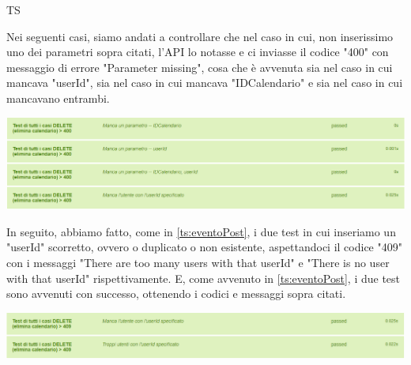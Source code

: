\begin{listaPersonale}{TS}
\begin{center}
                \end{center}
                Nei seguenti casi, siamo andati a controllare che nel caso in cui, non inserissimo uno dei parametri sopra citati, l'API lo notasse e ci inviasse il codice "400" con messaggio di errore "Parameter missing", cosa che è avvenuta sia nel caso in cui mancava "userId", sia nel caso in cui mancava "IDCalendario" e sia nel caso in cui mancavano entrambi.
                \begin{center}
                        \includegraphics[width=1\textwidth, height=0.15\textheight]{img/png/tests/CalendarioDelete/400_missingParameter_deleteCalendario.png}
                \end{center}
                In seguito, abbiamo fatto, come in \ref{ts:eventoPost}, i due test in cui inseriamo un "userId" scorretto, ovvero o duplicato o non esistente, aspettandoci il codice "409" con i messaggi "There are too many users with that userId" e "There is no user with that userId" rispettivamente. E, come avvenuto in \ref{ts:eventoPost}, i due test sono avvenuti con successo, ottenendo i codici e messaggi sopra citati.
                \begin{center}
                        \includegraphics[width=1\textwidth, height=0.08\textheight]{img/png/tests/CalendarioDelete/409_userId_deleteCalendario.png}

\end{center}
\end{listaPersonale}
